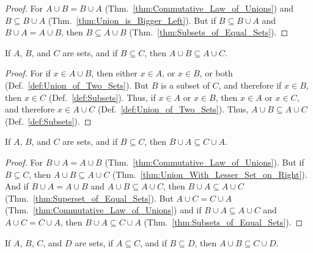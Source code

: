         \begin{proof}
            For $A\cup{B}=B\cup{A}$ (Thm.~\ref{thm:Commutative_Law_of_Unions})
            and $B\subseteq{B}\cup{A}$ (Thm.~\ref{thm:Union_is_Bigger_Left}).
            But if $B\subseteq{B}\cup{A}$ and $B\cup{A}=A\cup{B}$, then
            $B\subseteq{A}\cup{B}$ (Thm.~\ref{thm:Subsets_of_Equal_Sets}).
        \end{proof}
        \begin{theorem}
            \label{thm:Union_With_Lesser_Set_on_Right}%
            If $A$, $B$, and $C$ are sets, and if $B\subseteq{C}$, then
            $A\cup{B}\subseteq{A}\cup{C}$.
        \end{theorem}
        \begin{proof}
            For if $x\in{A}\cup{B}$, then either $x\in{A}$, or $x\in{B}$, or
            both (Def.~\ref{def:Union_of_Two_Sets}). But $B$ is a subset of $C$,
            and therefore if $x\in{B}$, then $x\in{C}$ (Def.~\ref{def:Subsets}).
            Thus, if $x\in{A}$ or $x\in{B}$, then $x\in{A}$ or $x\in{C}$, and
            therefore $x\in{A}\cup{C}$ (Def.~\ref{def:Union_of_Two_Sets}).
            Thus, $A\cup{B}\subseteq{A}\cup{C}$ (Def.~\ref{def:Subsets}).
        \end{proof}
        \begin{theorem}
            \label{thm:Union_With_Lesser_Set_on_Left}%
            If $A$, $B$, and $C$ are sets, and if $B\subseteq{C}$, then
            $B\cup{A}\subseteq{C}\cup{A}$.
        \end{theorem}
        \begin{proof}
            For $B\cup{A}=A\cup{B}$ (Thm.~\ref{thm:Commutative_Law_of_Unions}).
            But if $B\subseteq{C}$, then $A\cup{B}\subseteq{A}\cup{C}$
            (Thm.~\ref{thm:Union_With_Lesser_Set_on_Right}). And if
            $B\cup{A}=A\cup{B}$ and $A\cup{B}\subseteq{A}\cup{C}$, then
            $B\cup{A}\subseteq{A}\cup{C}$
            (Thm.~\ref{thm:Superset_of_Equal_Sets}). But $A\cup{C}=C\cup{A}$
            (Thm.~\ref{thm:Commutative_Law_of_Unions}) and if
            $B\cup{A}\subseteq{A}\cup{C}$ and $A\cup{C}=C\cup{A}$, then
            $B\cup{A}\subseteq{C}\cup{A}$
            (Thm.~\ref{thm:Subsets_of_Equal_Sets}).
        \end{proof}
        \begin{theorem}
            \label{thm:A_cup_B_Subset_C_cup_D}%
            If $A$, $B$, $C$, and $D$ are sets, if $A\subseteq{C}$, and if
            $B\subseteq{D}$, then $A\cup{B}\subseteq{C}\cup{D}$.
        \end{theorem}
